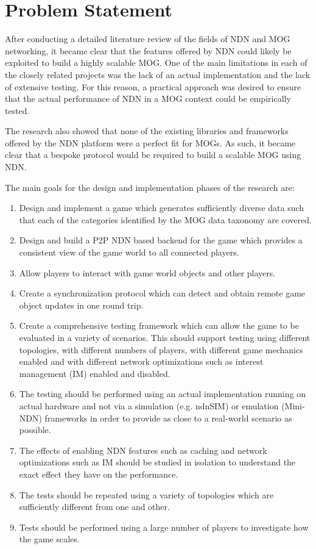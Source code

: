 \chapter{Problem Statement}\label{sec:problem-statement}
After conducting a detailed literature review of the fields of NDN and MOG networking, it became clear that the features offered by NDN could likely be exploited to build a highly scalable MOG. One of the main limitations in each of the closely related projects was the lack of an actual implementation and the lack of extensive testing. For this reason, a practical approach was desired to ensure that the actual performance of NDN in a MOG context could be empirically tested. 


The research also showed that none of the existing libraries and frameworks offered by the NDN platform were a perfect fit for MOGs. As such, it became clear that a bespoke protocol would be required to build a scalable MOG using NDN. 

The main goals for the design and implementation phases of the research are:

\begin{enumerate}
    \item Design and implement a game which generates sufficiently diverse data such that each of the categories identified by the MOG data taxonomy are covered.
    \item Design and build a P2P NDN based backend for the game which provides a consistent view of the game world to all connected players. 
    \item Allow players to interact with game world objects and other players.
    \item Create a synchronization protocol which can detect and obtain remote game object updates in one round trip.
    \item Create a comprehensive testing framework which can allow the game to be evaluated in a variety of scenarios. This should support testing using different topologies, with different numbers of players, with different game mechanics enabled and with different network optimizations such as interest management (IM) enabled and disabled.
    \item The testing should be performed using an actual implementation running on actual hardware and not via a simulation (e.g. ndnSIM) or emulation (Mini-NDN) frameworks in order to provide as close to a real-world scenario as possible.
    \item The effects of enabling NDN features such as caching and network optimizations such as IM should be studied in isolation to understand the exact effect they have on the performance.
    \item The tests should be repeated using a variety of topologies which are sufficiently different from one and other.
    \item Tests should be performed using a large number of players to investigate how the game scales.      
\end{enumerate}

